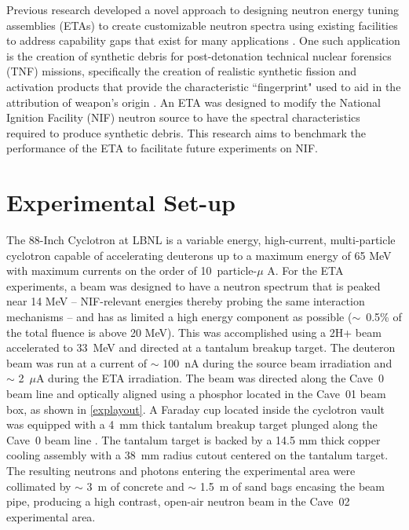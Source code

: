 \documentclass[twocolumn,10pt,final]{asme2ej}
\begin{document}
Previous research developed a novel approach to designing neutron energy tuning assemblies (ETAs) to create customizable neutron spectra using existing facilities to address capability gaps that exist for many applications \cite{Bevins2017}.  
One such application is the creation of synthetic debris for post-detonation technical nuclear forensics (TNF) missions, specifically the creation of realistic synthetic fission and activation products that provide the characteristic ``fingerprint" used to aid in the attribution of weapon's origin  \cite{111thCongress2010, JNFWG2013}.
An ETA was designed to modify the National Ignition Facility (NIF) neutron source to have the spectral characteristics required to produce synthetic debris.
This research aims to benchmark the performance of the ETA to facilitate future experiments on NIF.  


\vspace{-0.4 cm}
\section{Experimental Set-up} \label{sec:exp-setup}
The 88-Inch Cyclotron at LBNL is a variable energy, high-current, multi-particle cyclotron capable of accelerating deuterons up to a maximum energy of 65 MeV with maximum currents on the order of 10~particle-$\mu$ A. 
For the ETA experiments, a beam was designed to have a neutron spectrum that is peaked near 14 MeV -- NIF-relevant energies thereby probing the same interaction mechanisms -- and has as limited a high energy component as possible ($\sim$~0.5\% of the total fluence is above 20 MeV).
This was accomplished using a 2H+ beam accelerated to 33~MeV and directed at a tantalum breakup target.
The deuteron beam was run at a current of $\sim$ 100~nA during the source beam  irradiation and $\sim$ 2~$\mu$A during the ETA irradiation. 
The beam was directed along the Cave~0 beam line and optically aligned using a phosphor located in the Cave~01 beam box, as shown in \autoref{explayout}. 
A Faraday cup located inside the cyclotron vault was equipped with a 4~mm thick tantalum breakup target plunged along the Cave~0 beam line \cite{Bleuel2007}. 
The tantalum target is backed by a 14.5 mm thick copper cooling assembly with a 38~mm radius cutout centered on the tantalum target. 
The resulting neutrons and photons entering the experimental area were collimated by $\sim$ 3~m of concrete and $\sim$ 1.5~m of sand bags encasing the beam pipe, producing a high contrast, open-air neutron beam in the Cave~02 experimental area.
\end{document}
